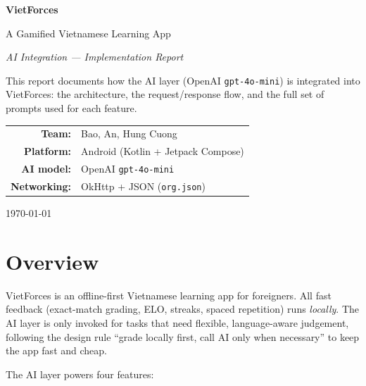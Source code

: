 \documentclass[11pt,a4paper]{article}
\begin{document}
\begin{titlepage}
\centering
\vspace*{2.5cm}
{\Huge\bfseries\color{vfred} VietForces\par}
\vspace{0.4cm}
{\Large A Gamified Vietnamese Learning App\par}
\vspace{0.2cm}
{\large\itshape AI Integration --- Implementation Report\par}
\vspace{1.6cm}
{\large
This report documents how the AI layer (OpenAI \texttt{gpt-4o-mini})
is integrated into VietForces: the architecture, the request/response
flow, and the full set of prompts used for each feature.\par}
\vspace{2.0cm}
\begin{tabular}{rl}
\textbf{Team:} & Bao, An, Hung Cuong \\[2pt]
\textbf{Platform:} & Android (Kotlin + Jetpack Compose) \\[2pt]
\textbf{AI model:} & OpenAI \texttt{gpt-4o-mini} \\[2pt]
\textbf{Networking:} & OkHttp + JSON (\texttt{org.json}) \\
\end{tabular}
\vfill
{\large \today\par}
\end{titlepage}

\tableofcontents
\newpage

\section{Overview}

VietForces is an offline-first Vietnamese learning app for foreigners. All
fast feedback (exact-match grading, ELO, streaks, spaced repetition) runs
\emph{locally}. The AI layer is only invoked for tasks that need flexible,
language-aware judgement, following the design rule ``grade locally first,
call AI only when necessary'' to keep the app fast and cheap.

\medskip
The AI layer powers four features:
\end{document}
